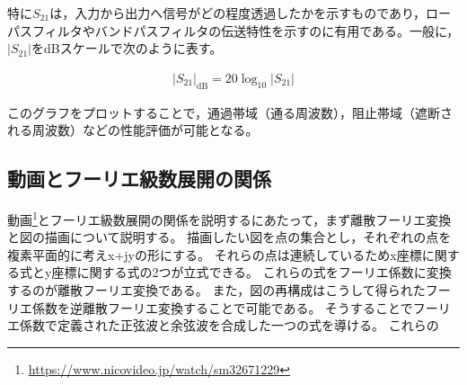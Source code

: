 \documentclass[11pt,dvipdfmx]{jarticle}
\begin{document}
特に$S_{21}$は，入力から出力へ信号がどの程度透過したかを示すものであり，ローパスフィルタやバンドパスフィルタの伝送特性を示すのに有用である。一般に，$|S_{21}|$をdBスケールで次のように表す。

\begin{eqnarray}
|S_{21}|_{\mathrm{dB}} = 20 \log_{10} |S_{21}|
\end{eqnarray}

このグラフをプロットすることで，通過帯域（通る周波数），阻止帯域（遮断される周波数）などの性能評価が可能となる。

\subsection{動画とフーリエ級数展開の関係}
動画\footnote{\url{https://www.nicovideo.jp/watch/sm32671229}}とフーリエ級数展開の関係を説明するにあたって，まず離散フーリエ変換と図の描画について説明する。
描画したい図を点の集合とし，それぞれの点を複素平面的に考えx+jyの形にする。
それらの点は連続しているためx座標に関する式とy座標に関する式の2つが立式できる。
これらの式をフーリエ係数に変換するのが離散フーリエ変換である。
また，図の再構成はこうして得られたフーリエ係数を逆離散フーリエ変換することで可能である。
そうすることでフーリエ係数で定義された正弦波と余弦波を合成した一つの式を導ける。
これらの
\end{document}
